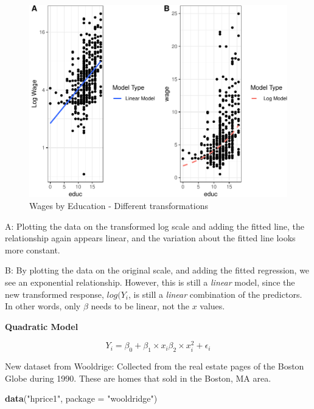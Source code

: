\documentclass[]{book}
\newenvironment{Shaded}{\begin{snugshade}}{\end{snugshade}}
\newcommand{\DataTypeTok}[1]{\textcolor[rgb]{0.13,0.29,0.53}{#1}}
\newcommand{\KeywordTok}[1]{\textcolor[rgb]{0.13,0.29,0.53}{\textbf{#1}}}
\newcommand{\NormalTok}[1]{#1}
\newcommand{\StringTok}[1]{\textcolor[rgb]{0.31,0.60,0.02}{#1}}
\begin{document}
\begin{figure}

{\centering \includegraphics[width=0.8\linewidth]{MEM5220_R_files/figure-latex/fig15-1} 

}

\caption{Wages by Education - Different transformations}\label{fig:fig15}
\end{figure}

A: Plotting the data on the transformed log scale and adding the fitted
line, the relationship again appears linear, and the variation about the
fitted line looks more constant.

B: By plotting the data on the original scale, and adding the fitted
regression, we see an exponential relationship. However, this is still a
\emph{linear} model, since the new transformed response, \(log(Y_{i}\),
is still a \emph{linear} combination of the predictors. In other words,
only \(\beta\) needs to be linear, not the \(x\) values.

\textbf{Quadratic Model}

\begin{equation}
Y_{i} = \beta_{0} + \beta_{1} \times x_{i}  \beta_{2} \times x^2_{i} + \epsilon_{i}
\end{equation}

New dataset from Wooldrige: Collected from the real estate pages of the
Boston Globe during 1990. These are homes that sold in the Boston, MA
area.

\begin{Shaded}
\begin{Highlighting}[]
\KeywordTok{data}\NormalTok{(}\StringTok{"hprice1"}\NormalTok{, }\DataTypeTok{package =} \StringTok{"wooldridge"}\NormalTok{)}
\end{Highlighting}
\end{Shaded}
\end{document}
